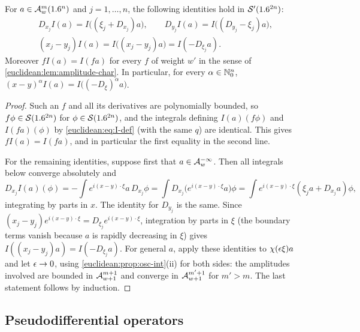 \begin{lemma}\label{euclidean:lem:kernel-identities}
  For $a\in\mathcal{A}^{m}_{w}(1.6^n)$ and $j=1,\dots,n$, the following identities hold in
  $\mathcal{S}'(1.6^{2n})$:
  \begin{gather*}
    D_{x_j}I(a)=I\bigl((\xi_j+D_{x_j})a\bigr),\qquad
    D_{y_j}I(a)=I\bigl((D_{y_j}-\xi_j)a\bigr),\\
    (x_j-y_j)I(a)=I\bigl((x_j-y_j)a\bigr)=I(-D_{\xi_j}a).
  \end{gather*}
  Moreover $fI(a)=I(fa)$ for every $f$ of weight $w'$ in the sense of
  \cref{euclidean:lem:amplitude-char}. In particular, for every
  $\alpha\in\mathbb{N}_0^n$, $(x-y)^\alpha I(a)=I\bigl((-D_\xi)^\alpha a\bigr)$.
\end{lemma}
\begin{proof}
  Such an $f$ and all its derivatives are polynomially bounded, so
  $f\phi\in\mathcal{S}(1.6^{2n})$ for $\phi\in\mathcal{S}(1.6^{2n})$, and the integrals defining
  $I(a)(f\phi)$ and $I(fa)(\phi)$ by \eqref{euclidean:eq:I-def} (with the same
  $q$) are identical. This gives $fI(a)=I(fa)$, and in particular the first
  equality in the second line.

  For the remaining identities, suppose first that $a\in\mathcal{A}^{-\infty}_{w}$. Then
  all integrals below converge absolutely and
  \begin{equation*}
    D_{x_j}I(a)(\phi)=-\int e^{i(x-y)\cdot\xi}a\,D_{x_j}\phi
    =\int D_{x_j}\bigl(e^{i(x-y)\cdot\xi}a\bigr)\phi
    =\int e^{i(x-y)\cdot\xi}(\xi_ja+D_{x_j}a)\phi,
  \end{equation*}
  integrating by parts in $x$. The identity for $D_{y_j}$ is the same.
  Since $(x_j-y_j)e^{i(x-y)\cdot\xi}=D_{\xi_j}e^{i(x-y)\cdot\xi}$, integration
  by parts in $\xi$ (the boundary terms vanish because $a$ is rapidly
  decreasing in $\xi$) gives $I((x_j-y_j)a)=I(-D_{\xi_j}a)$.
  For general $a$, apply these identities to $\chi(\epsilon\xi)a$ and let
  $\epsilon\to0$, using \cref{euclidean:prop:osc-int}(ii) for both sides: the
  amplitudes involved are bounded in $\mathcal{A}^{m+1}_{w+1}$ and converge in
  $\mathcal{A}^{m'+1}_{w+1}$ for $m'>m$. The last statement follows by induction.
\end{proof}

\subsection{Pseudodifferential operators}

